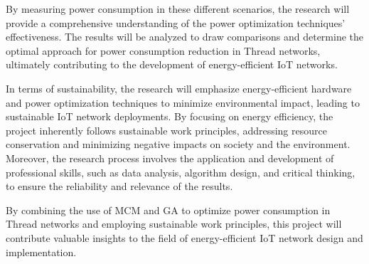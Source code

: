 By measuring power consumption in these different scenarios, the research will provide a comprehensive understanding of the power optimization techniques' effectiveness. The results will be analyzed to draw comparisons and determine the optimal approach for power consumption reduction in Thread networks, ultimately contributing to the development of energy-efficient IoT networks.

In terms of sustainability, the research will emphasize energy-efficient hardware and power optimization techniques to minimize environmental impact, leading to sustainable IoT network deployments. By focusing on energy efficiency, the project inherently follows sustainable work principles, addressing resource conservation and minimizing negative impacts on society and the environment. Moreover, the research process involves the application and development of professional skills, such as data analysis, algorithm design, and critical thinking, to ensure the reliability and relevance of the results.

By combining the use of MCM and GA to optimize power consumption in Thread networks and employing sustainable work principles, this project will contribute valuable insights to the field of energy-efficient IoT network design and implementation.
